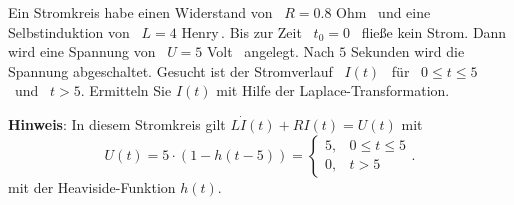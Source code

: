 {
Ein Stromkreis habe einen Widerstand von \ $R=0.8$ Ohm \ und eine Selbstinduktion von \ $L=4$ Henry\,. Bis zur Zeit \ $t_0=0$ \ fließe kein Strom. Dann wird eine Spannung von \ $U=5$ Volt \ angelegt. Nach $5$ Sekunden wird
die Spannung abgeschaltet. Gesucht ist der Stromverlauf \
$I(t)$ \ für \ $0 \le t \le 5$ \ und \ $t > 5$. 
Ermitteln Sie $I(t)$ mit Hilfe der Laplace-Transformation.
 
\noindent
\textbf{Hinweis}: In diesem Stromkreis gilt $L\dot I(t) + RI(t)=U(t)$ mit
$$U(t)=5\cdot(1-h(t-5))=\left\{\begin{array}{ll}
5,&0\leq t\leq 5\\
0,& t>5
\end{array}.\right.$$
mit der Heaviside-Funktion $h(t)$. 
}

